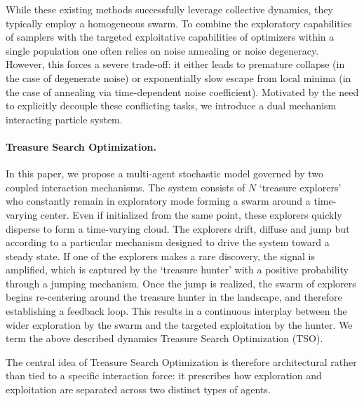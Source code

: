 \documentclass{article}
\numberwithin{equation}{section}
\begin{document}
While these existing methods successfully leverage collective dynamics, they typically employ a homogeneous swarm. To combine the exploratory capabilities of samplers with the targeted exploitative capabilities of optimizers within a single population one often relies on noise annealing or noise degeneracy. However, this forces a severe trade-off: it either leads to premature collapse (in the case of degenerate noise)  or exponentially slow escape from local minima (in the case of annealing via time-dependent noise coefficient). Motivated by the need to explicitly decouple these conflicting tasks, we introduce a dual mechanism interacting particle system. 

\paragraph{Treasure Search Optimization.} In this paper, we propose a multi-agent stochastic model governed by two coupled interaction mechanisms. The system consists of $N$ `treasure explorers' who constantly remain in exploratory mode forming a swarm around a time-varying center. Even if initialized from the same point, these explorers quickly disperse to form a time-varying cloud. 
The explorers drift, diffuse and jump but according to a particular mechanism designed to drive the system toward a steady state. If one of the explorers makes a rare discovery, the  signal is amplified, which is captured by the `treasure hunter' with a positive probability through a jumping mechanism. Once the jump is realized, the swarm of explorers begins re-centering around the treasure hunter in the landscape, and therefore establishing a feedback loop. This results in a continuous interplay between the wider exploration by the swarm and the targeted exploitation by the hunter. We term the above described dynamics Treasure Search Optimization (TSO).

The central idea of Treasure Search Optimization is therefore architectural rather than tied to a specific interaction force: it prescribes how exploration and exploitation are separated across two distinct types of agents.
\end{document}
